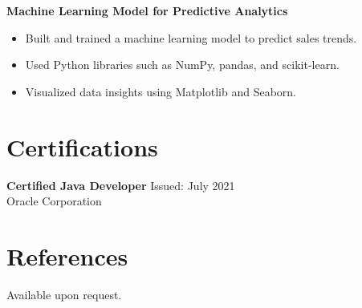 \documentclass[a4paper,10pt]{article}
\begin{document}
\textbf{Machine Learning Model for Predictive Analytics}
\begin{itemize}
    \item Built and trained a machine learning model to predict sales trends.
    \item Used Python libraries such as NumPy, pandas, and scikit-learn.
    \item Visualized data insights using Matplotlib and Seaborn.
\end{itemize}

\section*{Certifications}
\textbf{Certified Java Developer} Issued: July 2021 \\
Oracle Corporation

\section*{References}
Available upon request.
\end{document}

